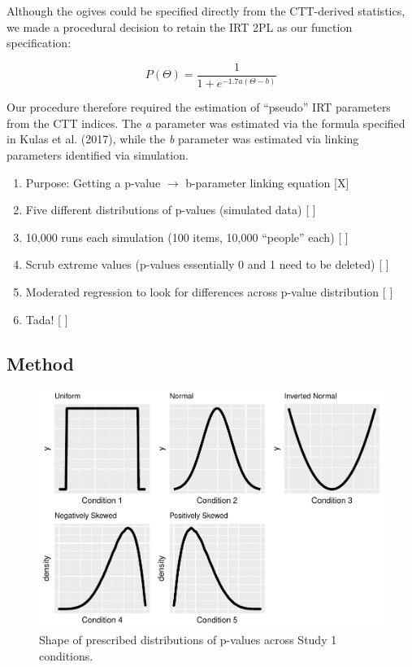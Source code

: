 \documentclass[
  man]{apa6}
\providecommand{\tightlist}{%
  \setlength{\itemsep}{0pt}\setlength{\parskip}{0pt}}
\begin{document}
Although the ogives could be specified directly from the CTT-derived statistics, we made a procedural decision to retain the IRT 2PL as our function specification:

\begin{equation}
P(\Theta)=\frac{1}{1+e^{-1.7a(\Theta-b)}}
\end{equation}

Our procedure therefore required the estimation of ``pseudo'' IRT parameters from the CTT indices. The \emph{a} parameter was estimated via the formula specified in Kulas et al. (2017), while the \emph{b} parameter was estimated via linking parameters identified via simulation.

\begin{enumerate}
\def\labelenumi{\arabic{enumi}.}
\tightlist
\item
  Purpose: Getting a p-value \(\rightarrow\) b-parameter linking equation {[}X{]}
\item
  Five different distributions of p-values (simulated data) {[} {]}
\item
  10,000 runs each simulation (100 items, 10,000 ``people'' each) {[} {]}\\
\item
  Scrub extreme values (p-values essentially 0 and 1 need to be deleted) {[} {]}
\item
  Moderated regression to look for differences across p-value distribution {[} {]}
\item
  Tada! {[} {]}
\end{enumerate}

\hypertarget{method}{%
\subsection{Method}\label{method}}

\begin{figure}
\centering
\includegraphics{ICC_project_files/figure-latex/simulatedgraphs-1.pdf}
\caption{\label{fig:simulatedgraphs}Shape of prescribed distributions of p-values across Study 1 conditions.}
\end{figure}
\end{document}
